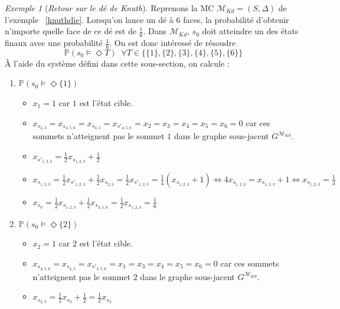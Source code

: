\documentclass[12pt,a4paper]{report}
\theoremstyle{definition}%
\theoremstyle{remark}
\newtheorem{example}{Exemple}[chapter]
\let\labelitemi\labelitemii
\begin{document}
\begin{example}[\textit{Retour sur le dé de Knuth}]
	Reprenons la MC $\mathcal{M}_{Kd} = (S, \Delta)$ de l'exemple ~\ref{knuthdie}. Lorsqu'on lance un dé à $6$ faces, la probabilité d'obtenir n'importe quelle face de ce dé est de $\frac{1}{6}$. Dans $\mathcal{M}_{Kd}$, $s_0$ doit atteindre un des états finaux avec une probabilité $\frac{1}{6}$. On est donc intéressé de résoudre \[\mathbb{P}(s_0 \models \Diamond T) \;\; \forall T \in \{\{1\},\{2\},\{3\},\{4\},\{5\},\{6\}\} \]
	\`A l'aide du système défini dans cette sous-section, on calcule :
	\begin{spacing}{1.5}
	\begin{enumerate}
		\item $\mathbb{P}(s_0 \models \Diamond \{1\})$
		\begin{itemize}
			\renewcommand{\labelitemi}{\tiny$\bullet$}
			\item $x_1 = 1 $ car $1$ est l'état cible.
			\item $x_{s_{2, 3}} = x_{s_{4, 5, 6}} = x_{s_{4, 5}} = x_{s'_{4, 5, 6}} = x_2 = x_3 = x_4 = x_5 = x_6 = 0$ car ces sommets n'atteignent pas le sommet $1$ dans le graphe sous-jacent $G^{\mathcal{M}_{Kd}}$.
			\item $x_{s'_{1, 2, 3}} = \frac{1}{2} x_{s_{1, 2, 3}} + \frac{1}{2}$
			\item $x_{s_{1, 2, 3}} = \frac{1}{2} x_{s'_{1, 2, 3}} + \frac{1}{2}x_{s_{2, 3}} = \frac{1}{2} x_{s'_{1, 2, 3}} = \frac{1}{4} (x_{s_{1, 2, 3}} + 1) \Leftrightarrow
			4 x_{s_{1, 2, 3}} =x_{s_{1, 2, 3}} + 1 \Leftrightarrow x_{s_{1, 2, 3}} = \frac{1}{3}$
			\item $x_{s_0} = \frac{1}{2} x_{s_{1,2,3}} + \frac{1}{2} x_{s_{4, 5, 6}} = \frac{1}{2} x_{s_{1,2,3}} = \frac{1}{6}$
		\end{itemize}
		\item $\mathbb{P}(s_0 \models \Diamond \{2\})$
		\begin{itemize}
			\renewcommand{\labelitemi}{\tiny$\bullet$}
			\item $x_2 = 1 $ car $2$ est l'état cible.
			\item $x_{s_{4, 5, 6}} = x_{s_{4, 5}} = x_{s'_{4, 5, 6}} = x_1 = x_3 = x_4 = x_5 = x_6 = 0$ car ces sommets n'atteignent pas le sommet $2$ dans le graphe sous-jacent $G^{\mathcal{M}_{Kd}}$.
			\item $x_{s_{2, 3}} = \frac{1}{2} x_{s_3}  + \frac{1}{2} = \frac{1}{2} x_{s_2}$

\end{itemize}
\end{enumerate}
\end{spacing}
\end{example}
\end{document}
